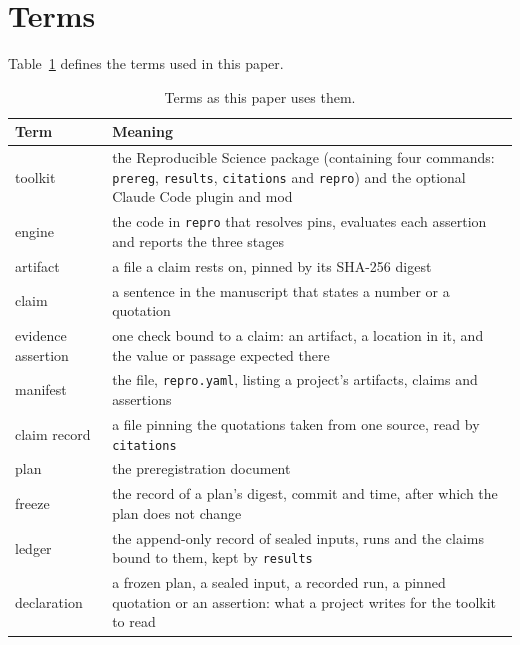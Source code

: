 \documentclass{article}
\newcommand{\code}[1]{\texttt{#1}}
\newcommand{\Sys}{Reproducible Science}
\newcommand{\tPlan}{\code{prereg}}
\newcommand{\tRun}{\code{results}}
\newcommand{\tCite}{\code{citations}}
\newcommand{\tVerify}{\code{repro}}
\begin{document}



\clearpage
\appendix



\section{Terms}
\label{sec:terms}

Table~\ref{tab:terms} defines the terms used in this paper.

\begin{table}[H]
\centering
\small
\caption{Terms as this paper uses them.}
\label{tab:terms}
\begin{tabular}{@{}>{\raggedright\arraybackslash}p{}>{\raggedright\arraybackslash}p{}@{}}
\toprule
\textbf{Term} & \textbf{Meaning} \\
\midrule
toolkit & the \Sys{} package (containing four commands: \tPlan{}, \tRun{}, \tCite{} and \tVerify{}) and the optional Claude Code plugin and mod \\
engine & the code in \tVerify{} that resolves pins, evaluates each assertion and reports the three stages \\
artifact & a file a claim rests on, pinned by its SHA-256 digest \\
claim & a sentence in the manuscript that states a number or a quotation \\
evidence assertion & one check bound to a claim: an artifact, a location in it, and the value or passage expected there \\
manifest & the file, \code{repro.yaml}, listing a project's artifacts, claims and assertions \\
claim record & a file pinning the quotations taken from one source, read by \tCite{} \\
plan & the preregistration document \\
freeze & the record of a plan's digest, commit and time, after which the plan does not change \\
ledger & the append-only record of sealed inputs, runs and the claims bound to them, kept by \tRun{} \\
declaration & a frozen plan, a sealed input, a recorded run, a pinned quotation or an assertion: what a project writes for the toolkit to read \\
\bottomrule
\end{tabular}
\end{table}
\end{document}
